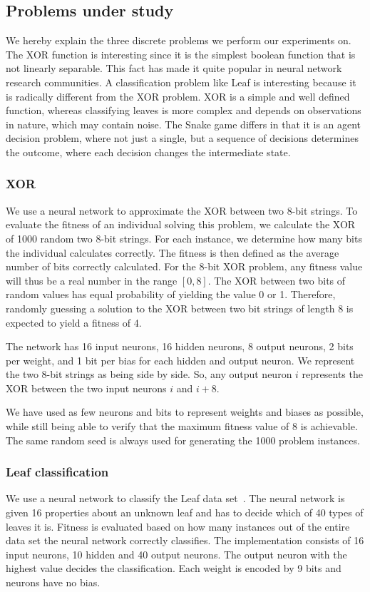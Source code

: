 \subsection{Problems under study}
\label{sec:problems}
We hereby explain the three discrete problems we perform our experiments on. 
The XOR function is interesting since it is the simplest boolean function that is not linearly separable. This fact has made it quite popular in neural network research communities\cite{masterThesisGANN}. A classification problem like Leaf is interesting because it is radically different from the XOR problem. XOR is a simple and well defined function, whereas classifying leaves is more complex and depends on observations in nature, which may contain noise. The Snake game differs in that it is an agent decision problem, where not just a single, but a sequence of decisions determines the outcome, where each decision changes the intermediate state.

\subsubsection{XOR}
We use a neural network to approximate the XOR between two 8-bit strings. To evaluate the fitness of an individual solving this problem, we calculate the XOR of \num{1000} random two 8-bit strings. For each instance, we determine how many bits the individual calculates correctly. The fitness is then defined as the average number of bits correctly calculated. For the 8-bit XOR problem, any fitness value will thus be a real number in the range $[0, 8]$. The XOR between two bits of random values has equal probability of yielding the value 0 or 1. Therefore, randomly guessing a solution to the XOR between two bit strings of length 8 is expected to yield a fitness of 4.

The network has 16 input neurons, 16 hidden neurons, 8 output neurons, 2 bits per weight, and 1 bit per bias for each hidden and output neuron. We represent the two 8-bit strings as being side by side. So, any output neuron $i$ represents the XOR between the two input neurons $i$ and $i+8$. 

We have used as few neurons and bits to represent weights and biases as possible, while still being able to verify that the maximum fitness value of 8 is achievable.
The same random seed is always used for generating the 1000 problem instances.

\subsubsection{Leaf classification}
We use a neural network to classify the Leaf data set~\cite{Bache+Lichman:2013, leafdataset}.
The neural network is given 16 properties about an unknown leaf and has to decide which of 40 types of leaves it is.
Fitness is evaluated based on how many instances out of the entire data set the neural network correctly classifies.
The implementation consists of 16 input neurons, 10 hidden and 40 output neurons. The output neuron with the highest value decides the classification. Each weight is encoded by 9 bits and neurons have no bias.

